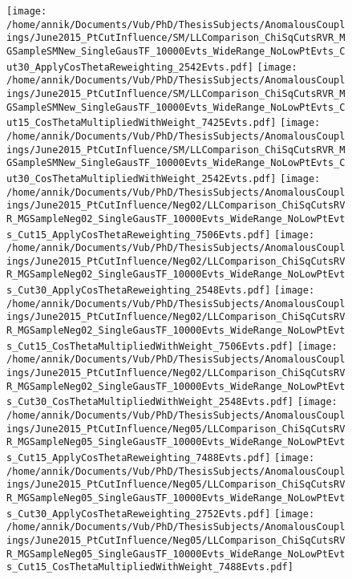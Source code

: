 \begin{figure}[h!t]
 \texttt{[image: /home/annik/Documents/Vub/PhD/ThesisSubjects/AnomalousCouplings/June2015\_PtCutInfluence/SM/LLComparison\_ChiSqCutsRVR\_MGSampleSMNew\_SingleGausTF\_10000Evts\_WideRange\_NoLowPtEvts\_Cut30\_ApplyCosThetaReweighting\_2542Evts.pdf]}
 \texttt{[image: /home/annik/Documents/Vub/PhD/ThesisSubjects/AnomalousCouplings/June2015\_PtCutInfluence/SM/LLComparison\_ChiSqCutsRVR\_MGSampleSMNew\_SingleGausTF\_10000Evts\_WideRange\_NoLowPtEvts\_Cut15\_CosThetaMultipliedWithWeight\_7425Evts.pdf]}
 \texttt{[image: /home/annik/Documents/Vub/PhD/ThesisSubjects/AnomalousCouplings/June2015\_PtCutInfluence/SM/LLComparison\_ChiSqCutsRVR\_MGSampleSMNew\_SingleGausTF\_10000Evts\_WideRange\_NoLowPtEvts\_Cut30\_CosThetaMultipliedWithWeight\_2542Evts.pdf]}
 \texttt{[image: /home/annik/Documents/Vub/PhD/ThesisSubjects/AnomalousCouplings/June2015\_PtCutInfluence/Neg02/LLComparison\_ChiSqCutsRVR\_MGSampleNeg02\_SingleGausTF\_10000Evts\_WideRange\_NoLowPtEvts\_Cut15\_ApplyCosThetaReweighting\_7506Evts.pdf]}
 \texttt{[image: /home/annik/Documents/Vub/PhD/ThesisSubjects/AnomalousCouplings/June2015\_PtCutInfluence/Neg02/LLComparison\_ChiSqCutsRVR\_MGSampleNeg02\_SingleGausTF\_10000Evts\_WideRange\_NoLowPtEvts\_Cut30\_ApplyCosThetaReweighting\_2548Evts.pdf]}
 \texttt{[image: /home/annik/Documents/Vub/PhD/ThesisSubjects/AnomalousCouplings/June2015\_PtCutInfluence/Neg02/LLComparison\_ChiSqCutsRVR\_MGSampleNeg02\_SingleGausTF\_10000Evts\_WideRange\_NoLowPtEvts\_Cut15\_CosThetaMultipliedWithWeight\_7506Evts.pdf]}
 \texttt{[image: /home/annik/Documents/Vub/PhD/ThesisSubjects/AnomalousCouplings/June2015\_PtCutInfluence/Neg02/LLComparison\_ChiSqCutsRVR\_MGSampleNeg02\_SingleGausTF\_10000Evts\_WideRange\_NoLowPtEvts\_Cut30\_CosThetaMultipliedWithWeight\_2548Evts.pdf]}
 \texttt{[image: /home/annik/Documents/Vub/PhD/ThesisSubjects/AnomalousCouplings/June2015\_PtCutInfluence/Neg05/LLComparison\_ChiSqCutsRVR\_MGSampleNeg05\_SingleGausTF\_10000Evts\_WideRange\_NoLowPtEvts\_Cut15\_ApplyCosThetaReweighting\_7488Evts.pdf]}
 \texttt{[image: /home/annik/Documents/Vub/PhD/ThesisSubjects/AnomalousCouplings/June2015\_PtCutInfluence/Neg05/LLComparison\_ChiSqCutsRVR\_MGSampleNeg05\_SingleGausTF\_10000Evts\_WideRange\_NoLowPtEvts\_Cut30\_ApplyCosThetaReweighting\_2752Evts.pdf]}
 \texttt{[image: /home/annik/Documents/Vub/PhD/ThesisSubjects/AnomalousCouplings/June2015\_PtCutInfluence/Neg05/LLComparison\_ChiSqCutsRVR\_MGSampleNeg05\_SingleGausTF\_10000Evts\_WideRange\_NoLowPtEvts\_Cut15\_CosThetaMultipliedWithWeight\_7488Evts.pdf]}

\end{figure}
